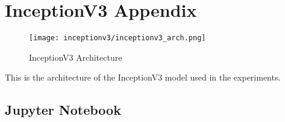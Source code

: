 \section{InceptionV3 Appendix}\label{s:inceptionv3_appendix}

\begin{figure}[H]
  \begin{center}
    \texttt{[image: inceptionv3/inceptionv3\_arch.png]}
  \end{center}
  \caption{InceptionV3 Architecture}\label{f:inceptionv3_arch}
\end{figure}

This is the architecture of the InceptionV3 model used in the experiments.

\subsection{Jupyter Notebook}

